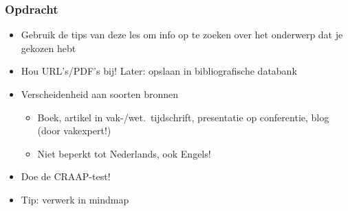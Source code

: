 \documentclass[aspectratio=169]{beamer}
\begin{document}
\begin{frame}
  \frametitle{Opdracht}

  \begin{itemize}
    \item Gebruik de tips van deze les om info op te zoeken over het onderwerp dat je gekozen hebt
    \item Hou URL's/PDF's bij! Later: opslaan in bibliografische databank
    \item Verscheidenheid aan soorten bronnen
          \begin{itemize}
            \item Boek, artikel in vak-/wet.\ tijdschrift, presentatie op conferentie, blog (door vakexpert!)
            \item Niet beperkt tot Nederlands, ook Engels!
          \end{itemize}
    \item Doe de CRAAP-test!
    \item Tip: verwerk in mindmap
  \end{itemize}

\end{frame}
\end{document}
